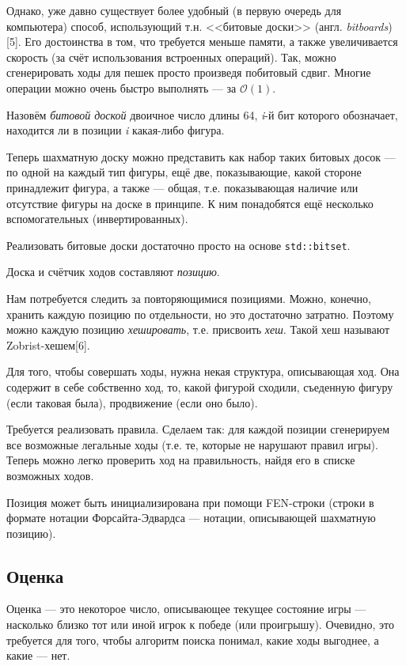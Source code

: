 {	Однако, уже давно существует более удобный (в первую очередь для компьютера) способ, использующий т.н. <<битовые доски>> (англ. \textit{bitboards})[5]. Его достоинства в том, что требуется меньше памяти, а также увеличивается скорость (за счёт использования встроенных операций). Так, можно сгенерировать ходы для пешек просто произведя побитовый сдвиг. Многие операции можно очень быстро выполнять --- за $\mathcal{O}(1)$.
	
	Назовём \textit{битовой доской} двоичное число длины 64, \textit{i}-й бит которого обозначает, находится ли в позиции \textit{i} какая-либо фигура.
	
	
	Теперь шахматную доску можно представить как набор таких битовых досок --- по одной на каждый тип фигуры, ещё две, показывающие, какой стороне принадлежит фигура, а также --- общая, т.е. показывающая наличие или отсутствие фигуры на доске в принципе. К ним понадобятся ещё несколько вспомогательных (инвертированных).
	
	Реализовать битовые доски достаточно просто на основе \texttt{std::bitset}.
	
	Доска и счётчик ходов составляют \textit{позицию}.
	
	Нам потребуется следить за повторяющимися позициями. Можно, конечно, хранить каждую позицию по отдельности, но это достаточно затратно. Поэтому можно каждую позицию \textit{хешировать}, т.е. присвоить \textit{хеш}. Такой хеш называют Zobrist-хешем[6].
	
	Для того, чтобы совершать ходы, нужна некая структура, описывающая ход. Она содержит в себе собственно ход, то, какой фигурой сходили, съеденную фигуру (если таковая была), продвижение (если оно было).
	
	Требуется реализовать правила. Сделаем так: для каждой позиции сгенерируем все возможные легальные ходы (т.е. те, которые не нарушают правил игры). Теперь можно легко проверить ход на правильность, найдя его в списке возможных ходов.
	
	Позиция может быть инициализирована при помощи FEN-строки (строки в формате нотации Форсайта-Эдвардса --- нотации, описывающей шахматную позицию).
	
	\subsection{Оценка}
	 
	 Оценка --- это некоторое число, описывающее текущее состояние игры --- насколько близко тот или иной игрок к победе (или проигрышу). Очевидно, это требуется для того, чтобы алгоритм поиска понимал, какие ходы выгоднее, а какие --- нет. 
	 
}
